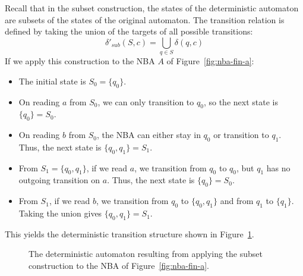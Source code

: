 Recall that in the subset construction, the states of the deterministic automaton are subsets of the states of the original automaton. The transition relation is defined by taking the union of the targets of all possible transitions:
$$\delta'_{sub}(S, c) = \bigcup_{q \in S} \delta(q, c)$$
If we apply this construction to the NBA $A$ of Figure~\ref{fig:nba-fin-a}:
\begin{itemize}
    \item The initial state is $S_0 = \{q_0\}$.
    \item On reading $a$ from $S_0$, we can only transition to $q_0$, so the next state is $\{q_0\} = S_0$.
    \item On reading $b$ from $S_0$, the NBA can either stay in $q_0$ or transition to $q_1$. Thus, the next state is $\{q_0, q_1\} = S_1$.
    \item From $S_1 = \{q_0, q_1\}$, if we read $a$, we transition from $q_0$ to $q_0$, but $q_1$ has no outgoing transition on $a$. Thus, the next state is $\{q_0\} = S_0$.
    \item From $S_1$, if we read $b$, we transition from $q_0$ to $\{q_0, q_1\}$ and from $q_1$ to $\{q_1\}$. Taking the union gives $\{q_0, q_1\} = S_1$.
\end{itemize}

This yields the deterministic transition structure shown in Figure~\ref{fig:subset-failed}.

\begin{figure}[H]
\centering
{}
\caption{The deterministic automaton resulting from applying the subset construction to the NBA of Figure~\ref{fig:nba-fin-a}.}
\label{fig:subset-failed}
\end{figure}

